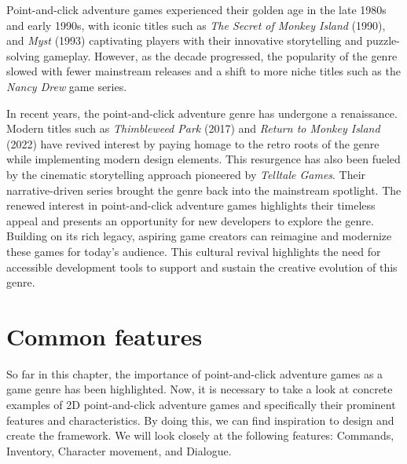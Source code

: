 Point-and-click adventure games experienced their golden age in the late 1980s and early 1990s, with iconic titles such as \textit{The Secret of Monkey Island} (1990), and \textit{Myst} (1993) captivating players with their innovative storytelling and puzzle-solving gameplay. However, as the decade progressed, the popularity of the genre slowed \cite{Qaffas202022} with fewer mainstream releases and a shift to more niche titles such as the \textit{Nancy Drew} game series.

In recent years, the point-and-click adventure genre has undergone a renaissance. Modern titles such as \textit{Thimbleweed Park} (2017) and \textit{Return to Monkey Island} (2022) have revived interest by paying homage to the retro roots of the genre while implementing modern design elements. This resurgence has also been fueled by the cinematic storytelling approach pioneered by \textit{Telltale Games}. Their narrative-driven series brought the genre back into the mainstream spotlight. The renewed interest in point-and-click adventure games highlights their timeless appeal and presents an opportunity for new developers to explore the genre. Building on its rich legacy, aspiring game creators can reimagine and modernize these games for today's audience. This cultural revival highlights the need for accessible development tools to support and sustain the creative evolution of this genre.

\section{Common features}
\label{sec:Common features}
So far in this chapter, the importance of point-and-click adventure games as a game genre has been highlighted. Now, it is necessary to take a look at concrete examples of 2D point-and-click adventure games and specifically their prominent features and characteristics. By doing this, we can find inspiration to design and create the framework. We will look closely at the following features: Commands, Inventory, Character movement, and Dialogue.


